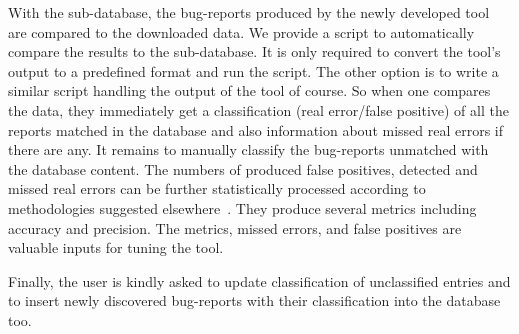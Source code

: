 With the sub-database, the bug-reports produced by the newly developed tool
are compared to the downloaded data. We provide a script to automatically
compare the results to the sub-database. It is only required to convert the
tool's output to a predefined format and run the script. The other option is
to write a similar script handling the output of the tool of course.  So when
one compares the data, they immediately get a classification (real error/false
positive) of all the reports matched in the database and also information
about missed real errors if there are any. It remains to manually classify the
bug-reports unmatched with the database content. The numbers of produced false
positives, detected and missed real errors can be further statistically
processed according to methodologies suggested elsewhere~\cite{HW08,
begbunch}. They produce several metrics including accuracy and precision. The
metrics, missed errors, and false positives are valuable inputs for tuning the
tool. 

Finally, the user is kindly asked to update classification of unclassified
entries and to insert newly discovered bug-reports with their classification
into the database too.


